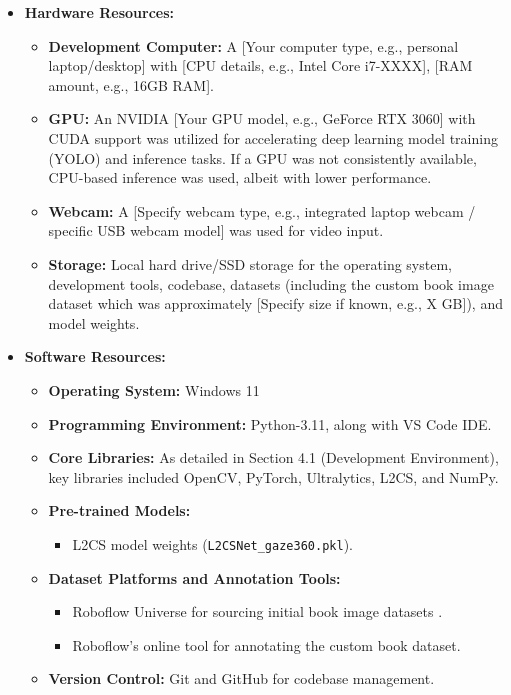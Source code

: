 \begin{itemize}
    \item \textbf{Hardware Resources:}
    \begin{itemize}
        \item \textbf{Development Computer:} A [Your computer type, e.g., personal laptop/desktop] with [CPU details, e.g., Intel Core i7-XXXX], [RAM amount, e.g., 16GB RAM].
        \item \textbf{GPU:} An NVIDIA [Your GPU model, e.g., GeForce RTX 3060] with CUDA support was utilized for accelerating deep learning model training (YOLO) and inference tasks. If a GPU was not consistently available, CPU-based inference was used, albeit with lower performance.
        \item \textbf{Webcam:} A [Specify webcam type, e.g., integrated laptop webcam / specific USB webcam model] was used for video input.
        \item \textbf{Storage:} Local hard drive/SSD storage for the operating system, development tools, codebase, datasets (including the custom book image dataset which was approximately [Specify size if known, e.g., X GB]), and model weights.
    \end{itemize}

    \item \textbf{Software Resources:}
    \begin{itemize}
        \item \textbf{Operating System:} Windows 11
        \item \textbf{Programming Environment:} Python-3.11, along with VS Code IDE.
        \item \textbf{Core Libraries:} As detailed in Section 4.1 (Development Environment), key libraries included OpenCV, PyTorch, Ultralytics, L2CS, and NumPy.
        \item \textbf{Pre-trained Models:}
            \begin{itemize}
                \item L2CS model weights (\texttt{L2CSNet\_gaze360.pkl}).
            \end{itemize}
        \item \textbf{Dataset Platforms and Annotation Tools:}
            \begin{itemize}
                \item Roboflow Universe for sourcing initial book image datasets \cite{Roboflow2024}.
                \item Roboflow's online tool for annotating the custom book dataset.
            \end{itemize}
        \item \textbf{Version Control:} Git and GitHub for codebase management.
    \end{itemize}


\end{itemize}
